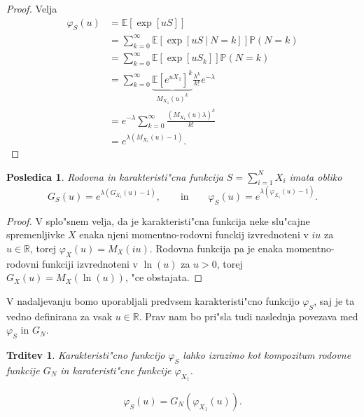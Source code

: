 \documentclass[12pt, a4paper, reqno]{amsart}
\theoremstyle{definition}
\theoremstyle{plain}
\newtheorem{trditev}[definicija]{Trditev}
\newtheorem{posledica}[definicija]{Posledica}
\newcommand{\R}{\mathbb{R}}
\newcommand{\E}{\mathbb{E}}
\newcommand{\Prob}{\mathbb{P}}
\newcommand{\1}{\mathds{1}}
\begin{document}
    \begin{proof}
        Velja
        \begin{align}
            \varphi_{S}(u) 
                    &= \E\left[\exp\left[uS\right]\right] \nonumber\\
                    &= \sum_{k=0}^{\infty}
                        \E\left[\exp\left[uS \ \big| \ N=k\right]\right]\Prob\left(N = k\right) \nonumber \\ 
                    &= \sum_{k=0}^{\infty}
                        \E\left[\exp\left[uS_k\right]\right]\Prob\left(N = k\right) \nonumber \\
                    &= \sum_{k=0}^{\infty}
                        \underbrace{\E\left[e^{uX_1}\right]^k}_{M_{X_1}(u)^k}\frac{\lambda^k}{k!}e^{-\lambda } \label{eq:MomentS}\\ 
                    &= e^{-\lambda }\sum_{k=0}^\infty\frac{\left(M_{X_1}(u)\lambda \right)^k}{k!} \nonumber \\
                    &= e^{\lambda \left(M_{X_1}(u) - 1\right)}. \nonumber
        \end{align}
    \end{proof}
    
    \begin{posledica}
        Rodovna in karakteristi"cna funkcija $S=\sum_{i = 1}^{N}X_i$ imata obliko 
        \begin{equation*}
            G_{S}(u) = e^{\lambda \left(G_{X_1}(u) - 1\right)}, \qquad \text{in} \qquad
            \varphi_{S}(u) = e^{\lambda \left(\varphi_{X_1}(u) - 1\right)}.
        \end{equation*}
        \label{pos:RodovnaKarakteristicna}
    \end{posledica}

    \begin{proof}
    V splo"snem velja, da je karakteristi"cna funkcija neke slu"cajne spremenljivke $X$ enaka
    njeni momentno-rodovni funckij izvrednoteni v $iu$ za $u\in\R$, torej $\varphi_X(u) = M_X(iu)$. Rodovna funkcija
    pa je enaka momentno-rodovni funkciji izvrednoteni v $\ln(u)$ za $u>0$, torej 
    $G_X(u) = M_X\left(\ln(u)\right)$, "ce obstajata.
    \end{proof}

    V nadaljevanju bomo uporabljali predvsem karakteristi"cno funkcijo $\varphi_S$, saj je ta vedno definirana 
    za vsak $u\in\R$. Prav nam bo pri"sla tudi naslednja povezava med $\varphi_S$ in $G_N$. 

    \begin{trditev}
        Karakteristi"cno funkcijo $\varphi_S$ lahko izrazimo kot kompozitum rodovne funkcije $G_N$ in 
        karateristi"cne funkcije $\varphi_{X_1}$.

        \begin{align*}
            \varphi_{S}(u) = G_{N}\left(\varphi_{X_1}(u)\right).
        \end{align*}

        \label{lema:povezavaRodovneKarkateristicne}
    \end{trditev}
\end{document}
